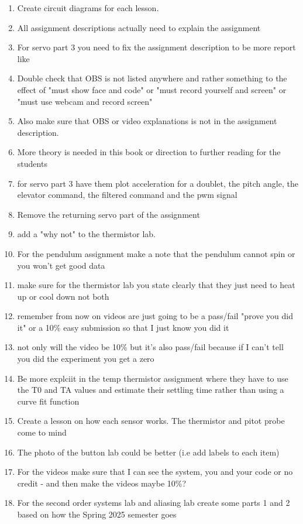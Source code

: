\begin{enumerate}[itemsep=-5pt]
\item Create circuit diagrams for each lesson.
\item All assignment descriptions actually need to explain the assignment
\item For servo part 3 you need to fix the assignment description to be more report like
\item Double check that OBS is not listed anywhere and rather something to the effect of "must show face and code" or "must record yourself and screen" or "must use webcam and record screen"
\item Also make sure that OBS or video explanations is not in the assignment description.
\item More theory is needed in this book or direction to further
  reading for the students
\item for servo part 3 have them plot acceleration for a doublet, the pitch angle, the elevator command, the filtered command and the pwm signal
\item Remove the returning servo part of the assignment
\item add a "why not" to the thermistor lab.
\item For the pendulum assignment make a note that the pendulum cannot spin or you won't get good data
\item make sure for the thermistor lab you state clearly that they just need to heat up or cool down not both
\item remember from now on videos are just going to be a pass/fail "prove you did it" or a 10\% easy submission so that I just know you did it
\item not only will the video be 10\% but it's also pass/fail because if I can't tell you did the experiment you get a zero
\item Be more explciit in the temp thermistor assignment where they have to use the T0 and TA values and estimate their settling time rather than using a curve fit function
\item Create a lesson on how each sensor works. The thermistor and pitot probe come to mind 
\item The photo of the button lab could be better (i.e add labels to
  each item)
\item For the videos make sure that I can see the system, you and your code or no credit - and then make the videos maybe 10\%?
\item For the second order systems lab and aliasing lab create some parts 1 and 2 based on how the Spring 2025 semester goes

\end{enumerate}
